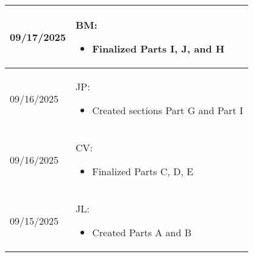 \begin{longtable}{|l||p{13.5cm}|}
09/17/2025 & BM:
\begin{itemize}[topsep=0pt,itemsep=0pt,parsep=0pt,partopsep=0pt,leftmargin=12pt]
\item Finalized Parts I, J, and H

\end{itemize} 
\\ \hline

09/16/2025 & JP:
\begin{itemize}[topsep=0pt,itemsep=0pt,parsep=0pt,partopsep=0pt,leftmargin=12pt]
\item Created sections Part G and Part I

\end{itemize} 
\\ \hline

09/16/2025 & CV:
\begin{itemize}[topsep=0pt,itemsep=0pt,parsep=0pt,partopsep=0pt,leftmargin=12pt]
\item  Finalized Parts C, D, E
\end{itemize} 
\\ \hline

09/15/2025 & JL:
\begin{itemize}[topsep=0pt,itemsep=0pt,parsep=0pt,partopsep=0pt,leftmargin=12pt]
\item  Created Parts A and B
\end{itemize} 
\\ \hline

\end{longtable}


